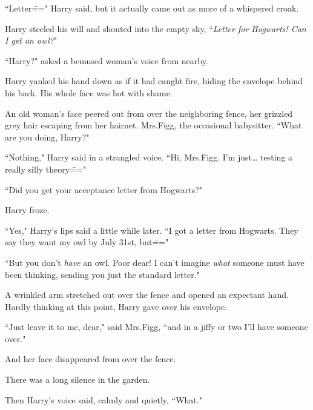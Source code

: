 ``Letter\===" Harry said, but it actually came out as more of a whispered croak.

Harry steeled his will and shouted into the empty sky, ``\emph{Letter for Hogwarts! Can I get an owl?}"

``Harry?" asked a bemused woman's voice from nearby.

Harry yanked his hand down as if it had caught fire, hiding the envelope behind his back. His whole face was hot with shame.

An old woman's face peered out from over the neighboring fence, her grizzled grey hair escaping from her hairnet. Mrs.\?Figg, the occasional babysitter. ``What are you doing, Harry?"

``Nothing," Harry said in a strangled voice. ``Hi, Mrs.\?Figg. I'm just{\ldots} testing a really silly theory\==="

``Did you get your acceptance letter from Hogwarts?"

Harry froze.

``Yes," Harry's lips said a little while later. ``I got a letter from Hogwarts. They say they want my owl by July 31st, but\==="

``But you don't \emph{have} an owl. Poor dear! I can't imagine \emph{what} someone must have been thinking, sending you just the standard letter."

A wrinkled arm stretched out over the fence and opened an expectant hand. Hardly thinking at this point, Harry gave over his envelope.

``Just leave it to me, dear," said Mrs.\?Figg, ``and in a jiffy or two I'll have someone over."

And her face disappeared from over the fence.

There was a long silence in the garden.

Then Harry's voice said, calmly and quietly, ``What."

